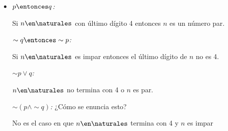 \begin{enumerate}[label=\roman*)]
\begin{itemize}
          \item[f)]
                \textit{$p \entonces q$:}
                \begin{center}
                  Si $n \en \naturales$ con último dígito 4 entonces $n$ es un número par.
                \end{center}

                \textit{$\sim q \entonces \sim p$:}
                \begin{center}
                  Si $n \en \naturales$ es impar entonces el último dígito de $n$ no es 4.
                \end{center}

                \textit{$\sim p \lor q$:}
                \begin{center}
                  $n \en \naturales$ no termina con 4 o $n$ es par.
                \end{center}

                \textit{$\sim (p \land \sim q)$:}
                ¿Cómo se enuncia esto?
                \begin{center}
                  No es el caso en que $n \en \naturales$ termina con 4 y $n$ es impar
                \end{center}
        \end{itemize}
\end{enumerate}

\begin{aportes}[4]
  \item {}
  \item {}
  \item {}
  \item {}
\end{aportes}

